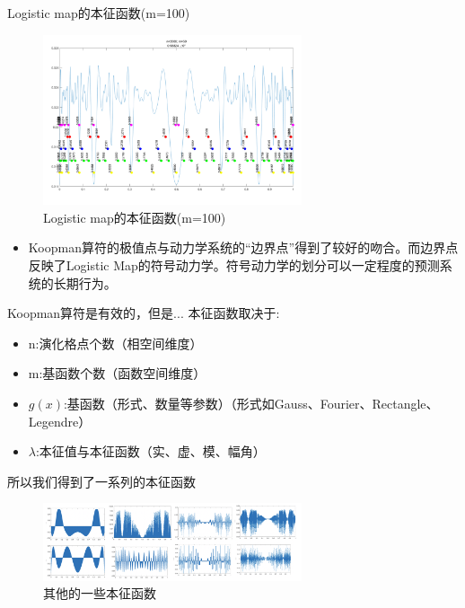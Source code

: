 \documentclass{beamer}
\begin{document}
\begin{frame}{Logistic map的本征函数(m=100)}
\begin{figure}
	\centering
	\includegraphics[width=3in]{figure/logistic_eigen_m100}
	\caption{Logistic map的本征函数(m=100)}
\end{figure}
\begin{itemize}
	\item Koopman算符的极值点与动力学系统的“边界点”得到了较好的吻合。而边界点反映了Logistic Map的符号动力学。符号动力学的划分可以一定程度的预测系统的长期行为。
\end{itemize}
\end{frame}

\begin{frame}{Koopman算符是有效的，但是...}
本征函数取决于:
\begin{itemize}
	\item n:演化格点个数（相空间维度）
	\item m:基函数个数（函数空间维度）
	\item $g(x)$:基函数（形式、数量等参数）（形式如Gauss、Fourier、Rectangle、Legendre）
	\item $\lambda$:本征值与本征函数（实、虚、模、幅角）
\end{itemize}
所以我们得到了一系列的本征函数
\begin{figure}
	\centering
	\includegraphics[width=3in]{figure/logistic_eigen_problem}
	\caption{其他的一些本征函数}
\end{figure}
\end{frame}
\end{document}
